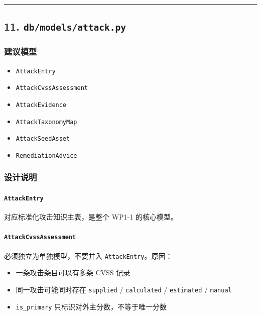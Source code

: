 \documentclass[UTF8]{ctexart}
\providecommand{\tightlist}{%
  \setlength{\itemsep}{0pt}\setlength{\parskip}{0pt}}
\begin{document}
\begin{center}\rule{0.5\linewidth}{0.5pt}\end{center}

\hypertarget{dbmodelsattack.py}{%
\subsection{\texorpdfstring{11.
\texttt{db/models/attack.py}}{11. db/models/attack.py}}\label{dbmodelsattack.py}}

\hypertarget{ux5efaux8baeux6a21ux578b-1}{%
\subsubsection{建议模型}\label{ux5efaux8baeux6a21ux578b-1}}

\begin{itemize}
\tightlist
\item
  \texttt{AttackEntry}
\item
  \texttt{AttackCvssAssessment}
\item
  \texttt{AttackEvidence}
\item
  \texttt{AttackTaxonomyMap}
\item
  \texttt{AttackSeedAsset}
\item
  \texttt{RemediationAdvice}
\end{itemize}

\hypertarget{ux8bbeux8ba1ux8bf4ux660e}{%
\subsubsection{设计说明}\label{ux8bbeux8ba1ux8bf4ux660e}}

\hypertarget{attackentry}{%
\paragraph{\texorpdfstring{\texttt{AttackEntry}}{AttackEntry}}\label{attackentry}}

对应标准化攻击知识主表，是整个 WP1-1 的核心模型。

\hypertarget{attackcvssassessment}{%
\paragraph{\texorpdfstring{\texttt{AttackCvssAssessment}}{AttackCvssAssessment}}\label{attackcvssassessment}}

必须独立为单独模型，不要并入 \texttt{AttackEntry}。原因：

\begin{itemize}
\tightlist
\item
  一条攻击条目可以有多条 CVSS 记录
\item
  同一攻击可能同时存在 \texttt{supplied} / \texttt{calculated} /
  \texttt{estimated} / \texttt{manual}
\item
  \texttt{is\_primary} 只标识对外主分数，不等于唯一分数
\end{itemize}
\end{document}
